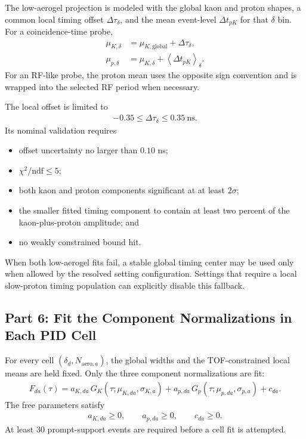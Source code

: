 \documentclass[11pt]{article}
\begin{document}
The low-aerogel projection is modeled with the global kaon and proton shapes,
a common local timing offset $\Delta\tau_\delta$, and the mean event-level
$\Delta t_{pK}$ for that $\delta$ bin.  For a coincidence-time probe,
\begin{align}
  \mu_{K,\delta}
  &=\mu_{K,\mathrm{global}}+\Delta\tau_\delta,\\
  \mu_{p,\delta}
  &=\mu_{K,\delta}+\left\langle\Delta t_{pK}\right\rangle_\delta.
\end{align}
For an RF-like probe, the proton mean uses the opposite sign convention and is
wrapped into the selected RF period when necessary.

The local offset is limited to
\begin{align}
  -0.35\leq\Delta\tau_\delta\leq0.35~\mathrm{ns}.
\end{align}
Its nominal validation requires
\begin{itemize}[leftmargin=2em]
  \item offset uncertainty no larger than $0.10$ ns;
  \item $\chi^2/\mathrm{ndf}\leq5$;
  \item both kaon and proton components significant at at least $2\sigma$;
  \item the smaller fitted timing component to contain at least two percent of
        the kaon-plus-proton amplitude; and
  \item no weakly constrained bound hit.
\end{itemize}

When both low-aerogel fits fail, a stable global timing center may be used only
when allowed by the resolved setting configuration.  Settings that require a
local slow-proton timing population can explicitly disable this fallback.

\subsection{Part 6: Fit the Component Normalizations in Each PID Cell}

For every cell $(\delta_d,N_{\mathrm{aero},a})$, the global widths and the
TOF-constrained local means are held fixed.  Only the three component
normalizations are fit:
\begin{align}
  F_{da}(\tau)
  =a_{K,da}\,G_K(\tau;\mu_{K,da},\sigma_{K,a})
   +a_{p,da}\,G_p(\tau;\mu_{p,da},\sigma_{p,a})
   +c_{da}.
\end{align}
The free parameters satisfy
\begin{align}
  a_{K,da}\geq0,\qquad
  a_{p,da}\geq0,\qquad
  c_{da}\geq0.
\end{align}
At least 30 prompt-support events are required before a cell fit is attempted.
\end{document}
